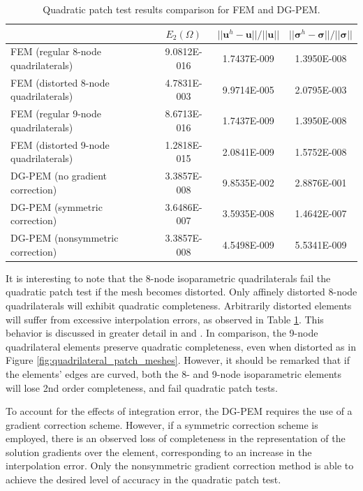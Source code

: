 \begin{table}[!ht]
  \begin{center}
    \begin{tabular}{| l || c | c | c |}
    \hline
           & $E_2 (\Omega)$ & $||\mathbf{u}^h - \mathbf{u}|| / ||\mathbf{u}||$ & $||\boldsymbol{\sigma}^h - \boldsymbol{\sigma}|| / ||\boldsymbol{\sigma}||$ \\ \hline \hline
    FEM (regular 8-node quadrilaterals) & 9.0812E-016 & 1.7437E-009 & 1.3950E-008 \\ \hline
    FEM (distorted 8-node quadrilaterals) & 4.7831E-003 & 9.9714E-005 & 2.0795E-003 \\ \hline
    FEM (regular 9-node quadrilaterals) & 8.6713E-016 & 1.7437E-009 & 1.3950E-008 \\ \hline
    FEM (distorted 9-node quadrilaterals) & 1.2818E-015 & 2.0841E-009 & 1.5752E-008 \\ \hline
    DG-PEM (no gradient correction) & 3.3857E-008 & 9.8535E-002 & 2.8876E-001 \\ \hline
    DG-PEM (symmetric correction) & 3.6486E-007 & 3.5935E-008 & 1.4642E-007 \\ \hline
    DG-PEM (nonsymmetric correction) & 3.3857E-008 & 4.5498E-009 & 5.5341E-009 \\
    \hline
    \end{tabular}
    \caption{Quadratic patch test results comparison for FEM and DG-PEM.}
    \vspace{-5pt}
    \label{tab:quadratic_patch_test}
    \vspace{-10pt}
  \end{center}
\end{table}

It is interesting to note that the 8-node isoparametric quadrilaterals fail the quadratic patch test if the mesh becomes distorted. Only affinely distorted 8-node quadrilaterals will exhibit quadratic completeness. Arbitrarily distorted elements will suffer from excessive interpolation errors, as observed in Table \ref{tab:quadratic_patch_test}. This behavior is discussed in greater detail in \cite{Arnold:02} and \cite{Arnold:01}. In comparison, the 9-node quadrilateral elements preserve quadratic completeness, even when distorted as in Figure \ref{fig:quadrilateral_patch_meshes}. However, it should be remarked that if the elements' edges are curved, both the 8- and 9-node isoparametric elements will lose 2nd order completeness, and fail quadratic patch tests.

To account for the effects of integration error, the DG-PEM requires the use of a gradient correction scheme. However, if a symmetric correction scheme is employed, there is an observed loss of completeness in the representation of the solution gradients over the element, corresponding to an increase in the interpolation error. Only the nonsymmetric gradient correction method is able to achieve the desired level of accuracy in the quadratic patch test.

